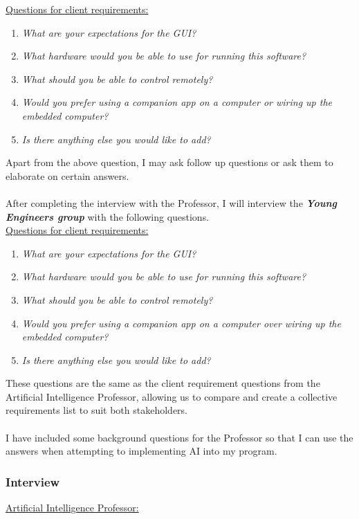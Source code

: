 \documentclass[11pt]{report}
\begin{document}
			\underline{Questions for client requirements:}
				\begin{enumerate}
					\item{\emph{What are your expectations for the GUI?}}
					\item{\emph{What hardware would you be able to use for running this software?}}
					\item{\emph{What should you be able to control remotely?}}
					\item{\emph{Would you prefer using a companion app on a computer or wiring up the embedded computer?}}
					\item{\emph{Is there anything else you would like to add?}}
				\end{enumerate}
			Apart from the above question, I may ask follow up questions or ask them to elaborate on certain answers.\\
			\\
			After completing the interview with the Professor, I will interview the \textbf{\emph{Young Engineers group}} with the following questions.\\


			\underline{Questions for client requirements:}
				\begin{enumerate}
					\item{\emph{What are your expectations for the GUI?}}
					\item{\emph{What hardware would you be able to use for running this software?}}
					\item{\emph{What should you be able to control remotely?}}
					\item{\emph{Would you prefer using a companion app on a computer over wiring up the embedded computer?}}
					\item{\emph{Is there anything else you would like to add?}}
				\end{enumerate}
			These questions are the same as the client requirement questions from the Artificial Intelligence Professor, allowing us to compare and create a collective requirements list to suit both stakeholders.\\\\
			I have included some background questions for the Professor so that I can use the answers when attempting to implementing AI into my program.  

		\subsubsection{Interview}
			\underline{Artificial Intelligence Professor:}\\
\end{document}
